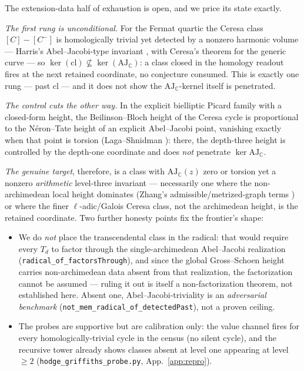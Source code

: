 \documentclass[11pt]{article}
\theoremstyle{definition}
\theoremstyle{remark}
\newcommand{\AJ}{\mathrm{AJ}}
\begin{document}
The extension-data half of exhaustion is open, and we price its state exactly.

\emph{The first rung is unconditional.} For the Fermat quartic the Ceresa class
$[C]-[C^-]$ is homologically trivial yet detected by a nonzero harmonic volume
--- Harris's Abel--Jacobi-type invariant \cite{Harris}, with Ceresa's theorem
for the generic curve \cite{Ceresa} --- so
$\ker(\mathrm{cl})\not\subseteq\ker(\AJ_{\mathbb C})$: a class closed in the
homology readout fires at the next retained coordinate, no conjecture
consumed. This is exactly one rung --- past $\mathrm{cl}$ --- and it does not
show the $\AJ_{\mathbb C}$-kernel itself is penetrated.

\emph{The control cuts the other way.} In the explicit bielliptic Picard family
with a closed-form height, the Beilinson--Bloch height of the Ceresa cycle is
proportional to the N\'eron--Tate height of an explicit Abel--Jacobi point,
vanishing exactly when that point is torsion (Laga--Shnidman
\cite{LagaShnidman}): there, the depth-three height is controlled by the
depth-one coordinate and does \emph{not} penetrate $\ker\AJ_{\mathbb C}$.

\emph{The genuine target}, therefore, is a class with $\AJ_{\mathbb C}(z)$ zero
or torsion yet a nonzero \emph{arithmetic} level-three invariant ---
necessarily one where the non-archimedean local height dominates (Zhang's
admissible/metrized-graph terms \cite{ZhangGS}) or where the finer
$\ell$-adic/Galois Ceresa class, not the archimedean height, is the retained
coordinate. Two further honesty points fix the frontier's shape:

\begin{itemize}
\item We do \emph{not} place the transcendental class in the radical: that
would require every $T_d$ to factor through the single-archimedean
Abel--Jacobi realization (\texttt{radical\_of\_factorsThrough}), and since the
global Gross--Schoen height carries non-archimedean data absent from that
realization, the factorization cannot be assumed --- ruling it out is itself a
non-factorization theorem, not established here. Absent one,
Abel--Jacobi-triviality is an \emph{adversarial benchmark}
(\texttt{not\_mem\_radical\_of\_detectedPast}), not a proven ceiling.
\item The probes are supportive but are calibration only: the value channel
fires for every homologically-trivial cycle in the census (no silent cycle),
and the recursive tower already shows classes absent at level one appearing at
level $\ge2$ (\texttt{hodge\_griffiths\_probe.py}, App.~\ref{app:repro}).
\end{itemize}
\end{document}
